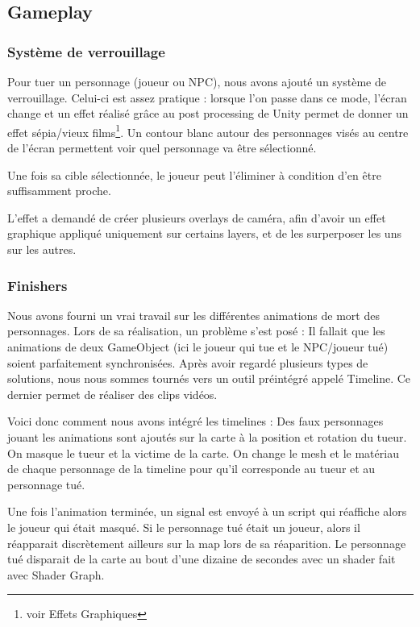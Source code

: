 \subsection{Gameplay}

\subsubsection{Système de verrouillage}

Pour tuer un personnage (joueur ou NPC),
nous avons ajouté un système de verrouillage. Celui-ci est assez pratique : lorsque l'on passe dans ce mode, l'écran change et 
un effet réalisé grâce au post processing de Unity permet de donner un effet sépia/vieux films\footnote{voir Effets Graphiques}.
Un contour blanc autour des personnages visés au centre de l'écran permettent voir quel personnage va être sélectionné.

Une fois sa cible sélectionnée, le joueur peut l'éliminer à condition d'en être suffisamment proche.

L'effet a demandé de créer plusieurs overlays de caméra, afin d'avoir un effet graphique
appliqué uniquement sur certains layers, et de les surperposer les uns sur les autres. 

\subsubsection{Finishers}
Nous avons fourni un vrai travail sur les différentes animations de mort des personnages.
Lors de sa réalisation, un problème s'est posé : Il fallait que les animations de deux GameObject (ici le joueur qui tue et le NPC/joueur tué) 
soient parfaitement synchronisées. Après avoir regardé plusieurs types de solutions, nous nous sommes tournés vers un outil préintégré appelé Timeline.
Ce dernier permet de réaliser des clips vidéos.

Voici donc comment nous avons intégré les timelines :
\newline
Des faux personnages jouant les animations sont ajoutés sur la carte à la position et rotation du tueur.
On masque le tueur et la victime de la carte.
On change le mesh et le matériau de chaque personnage de la timeline pour qu'il corresponde au tueur et au
personnage tué.

Une fois l'animation terminée, un signal est envoyé à un script qui réaffiche alors le joueur qui était masqué.
Si le personnage tué était un joueur, alors il réapparait discrètement ailleurs sur la map lors de sa réaparition.
Le personnage tué disparait de la carte au bout d'une dizaine de secondes avec un shader fait avec Shader Graph.

